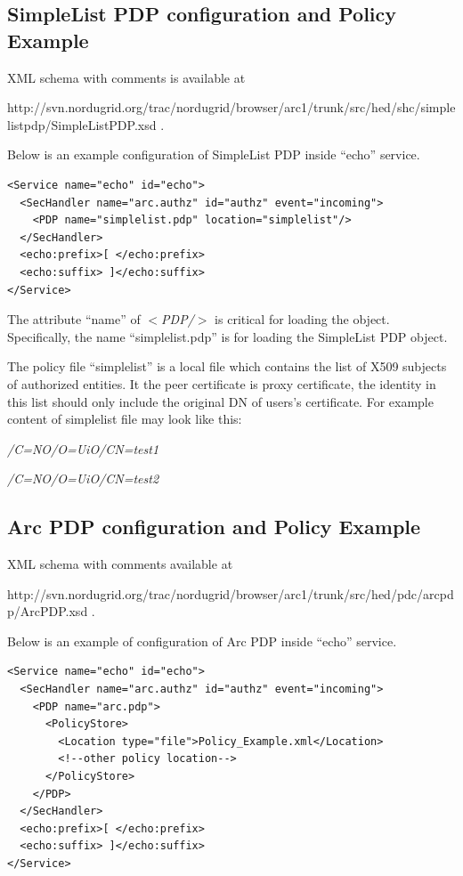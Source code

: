 \documentclass{article}                            %
\begin{document}
\subsection{SimpleList PDP configuration and Policy Example} %
\label{subsec:simplepdp_conf}
XML schema with comments is available at 

http://svn.nordugrid.org/trac/nordugrid/browser/arc1/trunk/src/hed/shc/simplelistpdp/SimpleListPDP.xsd .

Below is an example configuration of SimpleList PDP inside ``echo'' service.

\begin{verbatim}
<Service name="echo" id="echo">
  <SecHandler name="arc.authz" id="authz" event="incoming">
    <PDP name="simplelist.pdp" location="simplelist"/>
  </SecHandler>
  <echo:prefix>[ </echo:prefix>
  <echo:suffix> ]</echo:suffix>
</Service>
\end{verbatim}

The attribute ``name'' of \textit{$<$PDP/$>$} is critical for loading the object. Specifically, the name ``simplelist.pdp'' is for loading the SimpleList PDP object.

The policy file ``simplelist'' is a local file which contains the list of X509 subjects of authorized entities. It the peer certificate is proxy certificate, the identity in this list should only include the original DN of users's certificate.
For example content of simplelist file may look like this:

\emph{/C=NO/O=UiO/CN=test1}

\emph{/C=NO/O=UiO/CN=test2}



\subsection{Arc PDP configuration and Policy Example} %
\label{subsec:arcpdp_conf}
XML schema with comments available at 

http://svn.nordugrid.org/trac/nordugrid/browser/arc1/trunk/src/hed/pdc/arcpdp/ArcPDP.xsd .

Below is an example of configuration of Arc PDP inside ``echo'' service.
\begin{verbatim}
<Service name="echo" id="echo">
  <SecHandler name="arc.authz" id="authz" event="incoming">
    <PDP name="arc.pdp">
      <PolicyStore>
        <Location type="file">Policy_Example.xml</Location>
        <!--other policy location-->
      </PolicyStore>
    </PDP>
  </SecHandler>
  <echo:prefix>[ </echo:prefix>
  <echo:suffix> ]</echo:suffix>
</Service>
\end{verbatim}
\end{document}
